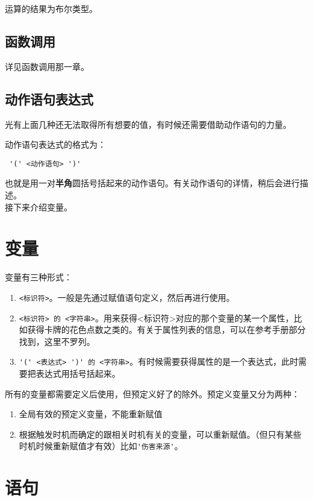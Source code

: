 运算的结果为布尔类型。

\subsection{函数调用}

详见函数调用那一章。

\subsection{动作语句表达式}

光有上面几种还无法取得所有想要的值，有时候还需要借助动作语句的力量。

动作语句表达式的格式为：

\begin{verbatim}
 '(' <动作语句> ')'
\end{verbatim}

也就是用一对\textbf{半角}圆括号括起来的动作语句。有关动作语句的详情，稍后会进行描述。\\

接下来介绍变量。

\section{变量}

变量有三种形式：

\begin{enumerate}
 \item \verb|<标识符>|。一般是先通过赋值语句定义，然后再进行使用。
 \item \verb|<标识符> 的 <字符串>|。用来获得<标识符>对应的那个变量的某一个属性，比如获得卡牌的花色点数之类的。有关于属性列表的信息，可以在参考手册部分找到，这里不罗列。
 \item \verb|'(' <表达式> ')' 的 <字符串>|。有时候需要获得属性的是一个表达式，此时需要把表达式用括号括起来。
\end{enumerate}

所有的变量都需要定义后使用，但预定义好了的除外。预定义变量又分为两种：

\begin{enumerate}
 \item 全局有效的预定义变量，不能重新赋值
 \item 根据触发时机而确定的跟相关时机有关的变量，可以重新赋值。（但只有某些时机时候重新赋值才有效）比如\verb|'伤害来源'|。
\end{enumerate}

\section{语句}


